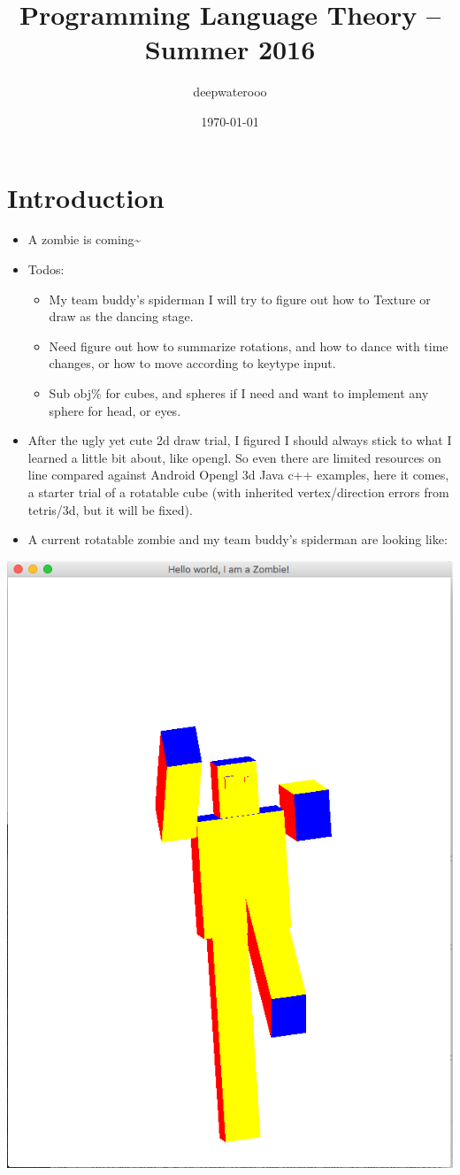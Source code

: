 \documentclass[9pt,b5paper]{article}
\author{deepwaterooo}
\date{\today}
\title{Programming Language Theory -- Summer 2016}
\begin{document}
\maketitle
\tableofcontents


\section{Introduction}
\label{sec-1}
\begin{itemize}
\item A zombie is coming\textasciitilde{}
\item Todos: 
\begin{itemize}
\item My team buddy's spiderman I will try to figure out how to Texture or draw as the dancing stage.
\item Need figure out how to summarize rotations, and how to dance with time changes, or how to move according to keytype input.
\item Sub obj\% for cubes, and spheres if I need and want to implement any sphere for head, or eyes.
\end{itemize}
\item After the ugly yet cute 2d draw trial, I figured I should always stick to what I learned a little bit about, like opengl. So even there are limited resources on line compared against Android Opengl 3d Java c++ examples, here it comes, a starter trial of a rotatable cube (with inherited vertex/direction errors from tetris/3d, but it will be fixed).
\item A current rotatable zombie and my team buddy's spiderman are looking like:
\end{itemize}

\includegraphics[width=.9\linewidth]{./pic/Screen_Shot_2016-05-27_at_12_05_08_AM.png}
\end{document}

